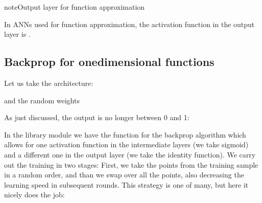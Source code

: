 \documentclass[letterpaper,10pt,english]{jupyterBook}
\begin{document}
\begin{sphinxadmonition}{note}{Output layer for function approximation}

\sphinxAtStartPar
In ANNs used for function approximation, the activation function in the output layer is .
\end{sphinxadmonition}


\subsection{Backprop for one\sphinxhyphen{}dimensional functions}
\label{\detokenize{docs/interpol:backprop-for-one-dimensional-functions}}
\sphinxAtStartPar
Let us take the architecture:

\begin{sphinxVerbatim}[commandchars=\\\{\}]
\PYG{p}{[}\PYG{p}{]}
\end{sphinxVerbatim}

\sphinxAtStartPar
and the random weights

\begin{sphinxVerbatim}[commandchars=\\\{\}]
 
\end{sphinxVerbatim}

\sphinxAtStartPar
As just discussed, the output is no longer between 0 and 1:

\begin{sphinxVerbatim}[commandchars=\\\{\}]
 \PYG{p}{[}\PYG{p}{]}
 
\end{sphinxVerbatim}

\noindent{}

\sphinxAtStartPar
In the library module  we have the function for the backprop algorithm which allows for one activation function in the intermediate layers (we take sigmoid) and a different one in the output layer (we take the identity function). We carry out the training in two stages: First, we take the points from the training sample in a random order, and than we swap over all the points, also decreasing the learning speed in subsequent rounds. This strategy is one of many, but here it nicely does the job:
\end{document}
